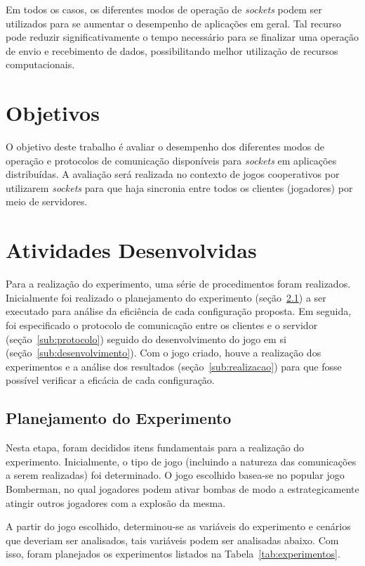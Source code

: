\documentclass[12pt]{article}
\begin{document}
Em todos os casos, os diferentes modos de operação de \emph{sockets} podem ser
utilizados para se aumentar o desempenho de aplicações em geral. Tal recurso
pode reduzir significativamente o tempo necessário para se finalizar uma
operação de envio e recebimento de dados, possibilitando melhor utilização de
recursos computacionais.

\section{Objetivos} \label{sec:objetivos}

O objetivo deste trabalho é avaliar o desempenho dos diferentes modos de
operação e protocolos de comunicação disponíveis para \emph{sockets} em
aplicações distribuídas. A avaliação será realizada no contexto de jogos
cooperativos por utilizarem \emph{sockets} para que haja sincronia entre todos
os clientes (jogadores) por meio de servidores.

\section{Atividades Desenvolvidas} \label{sec:atividades}

Para a realização do experimento, uma série de procedimentos foram realizados.
Inicialmente foi realizado o planejamento do experimento
(seção~\ref{sub:planejamento}) a ser executado para análise da eficiência de
cada configuração proposta. Em seguida, foi especificado o protocolo de
comunicação entre os clientes e o servidor (seção~\ref{sub:protocolo}) seguido
do desenvolvimento do jogo em si (seção~\ref{sub:desenvolvimento}). Com o jogo
criado, houve a realização dos experimentos e a análise dos resultados
(seção~\ref{sub:realizacao}) para que fosse possível verificar a eficácia de
cada configuração.

\subsection{Planejamento do Experimento} \label{sub:planejamento}

Nesta etapa, foram decididos itens fundamentais para a realização do
experimento. Inicialmente, o tipo de jogo (incluindo a natureza das
comunicações a serem realizadas) foi determinado. O jogo escolhido basea-se no
popular jogo Bomberman, no qual jogadores podem ativar bombas de modo a
estrategicamente atingir outros jogadores com a explosão da mesma.

A partir do jogo escolhido, determinou-se as variáveis do experimento e
cenários que deveriam ser analisados, tais variáveis podem ser analisadas
abaixo. Com isso, foram planejados os experimentos listados na Tabela~\ref{tab:experimentos}.
\end{document}
